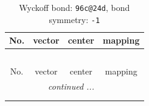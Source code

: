 \documentclass[fleqn,8pt]{jsarticle}
\begin{document}
\renewcommand{\arraystretch}{1.2}
\begin{longtable}{cccc}
\caption{Wyckoff bond: {\tt 96c@24d}, bond symmetry: {\tt -1}}
 \\
 \hline \hline
No. & vector & center & mapping \\ \hline \endfirsthead

\multicolumn{3}{l}{\tablename\ \thetable{}} \\
 \hline \hline
No. & vector & center & mapping \\ \hline \endhead

 \hline \hline
\multicolumn{3}{r}{\footnotesize\it continued ...} \\ \endfoot

 \hline \hline
\multicolumn{3}{r}{} \\ \endlastfoot


\end{longtable}
\end{document}
